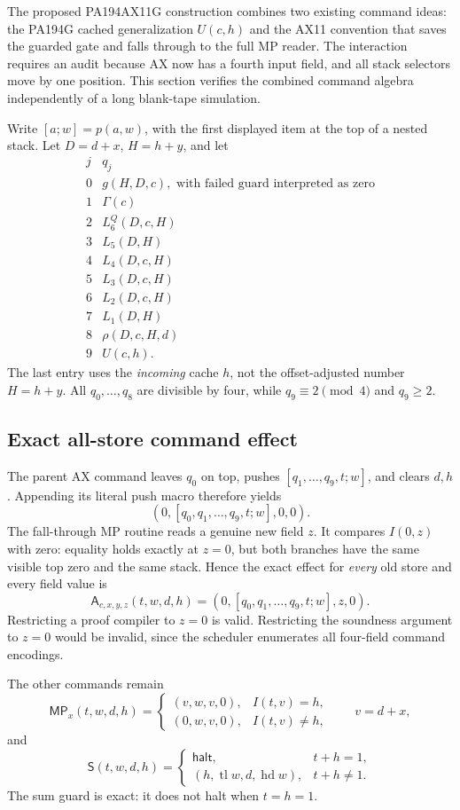 The proposed PA194AX11G construction combines two existing command ideas:
the PA194G cached generalization $U(c,h)$ and the AX11 convention that saves
the guarded gate and falls through to the full MP reader. The interaction
requires an audit because AX now has a fourth input field, and all stack
selectors move by one position. This section verifies the combined command
algebra independently of a long blank-tape simulation.

Write $[a;w]=p(a,w)$, with the first displayed item at the top of a nested
stack. Let $D=d+x$, $H=h+y$, and let
\[
\begin{array}{c|l}
j&q_j\\\hline
0&g(H,D,c),\text{ with failed guard interpreted as zero}\\
1&\Gamma(c)\\
2&L_6^Q(D,c,H)\\
3&L_5(D,H)\\
4&L_4(D,c,H)\\
5&L_3(D,c,H)\\
6&L_2(D,c,H)\\
7&L_1(D,H)\\
8&\rho(D,c,H,d)\\
9&U(c,h).
\end{array}
\]
The last entry uses the \emph{incoming} cache $h$, not the offset-adjusted
number $H=h+y$. All $q_0,\ldots,q_8$ are divisible by four, while
$q_9\equiv2\pmod4$ and $q_9\ge2$.

\subsection{Exact all-store command effect}

The parent AX command leaves $q_0$ on top, pushes
$[q_1,\ldots,q_9,t;w]$, and clears $d,h$. Appending its literal push macro
therefore yields
\[
 (0,[q_0,q_1,\ldots,q_9,t;w],0,0).
\]
The fall-through MP routine reads a genuine new field $z$. It compares
$I(0,z)$ with zero: equality holds exactly at $z=0$, but both branches
have the same visible top zero and the same stack. Hence the exact effect
for \emph{every} old store and every field value is
\[
 \mathsf A_{c,x,y,z}(t,w,d,h)
       =(0,[q_0,q_1,\ldots,q_9,t;w],z,0).
 \tag{G11-A}
\]
Restricting a proof compiler to $z=0$ is valid. Restricting the soundness
argument to $z=0$ would be invalid, since the scheduler enumerates all
four-field command encodings.

The other commands remain
\[
 \mathsf{MP}_x(t,w,d,h)=
 \begin{cases}(v,w,v,0),&I(t,v)=h,\\
              (0,w,v,0),&I(t,v)\ne h,
 \end{cases}\qquad v=d+x,
\]
and
\[
 \mathsf S(t,w,d,h)=
 \begin{cases}\mathsf{halt},&t+h=1,\\
 (h,\operatorname{tl}w,d,\operatorname{hd}w),&t+h\ne1.
 \end{cases}
\]
The sum guard is exact: it does not halt when $t=h=1$.

